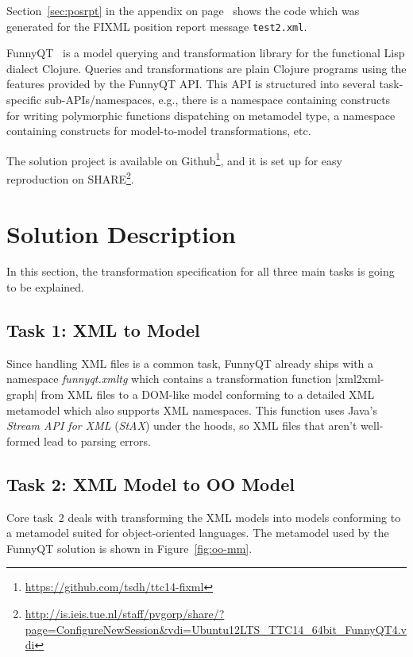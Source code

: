 \documentclass[submission]{eptcs}
\newcommand{\code}{\clojureinline}
\begin{document}
Section~\ref{sec:posrpt} in the appendix on page~\pageref{sec:posrpt} shows the
code which was generated for the FIXML position report message
\texttt{test2.xml}.

FunnyQT~\cite{Horn2013MQWFQ} is a model querying and transformation library for
the functional Lisp dialect Clojure.  Queries and transformations are plain
Clojure programs using the features provided by the FunnyQT API.  This API is
structured into several task-specific sub-APIs/namespaces, e.g., there is a
namespace containing constructs for writing polymorphic functions dispatching
on metamodel type, a namespace containing constructs for model-to-model
transformations, etc.

The solution project is available on
Github\footnote{\url{https://github.com/tsdh/ttc14-fixml}}, and it is set up
for easy reproduction on
SHARE\footnote{\url{http://is.ieis.tue.nl/staff/pvgorp/share/?page=ConfigureNewSession&vdi=Ubuntu12LTS_TTC14_64bit_FunnyQT4.vdi}}.

\section{Solution Description}
\label{sec:solution-description}

In this section, the transformation specification for all three main tasks is
going to be explained.

\subsection{Task 1: XML to Model}
\label{sec:xml2model}

Since handling XML files is a common task, FunnyQT already ships with a
namespace \emph{funnyqt.xmltg} which contains a transformation function
\code|xml2xml-graph| from XML files to a DOM-like model conforming to a
detailed XML metamodel which also supports XML namespaces.  This function uses
Java's \emph{Stream API for XML} (\emph{StAX}) under the hoods, so XML files
that aren't well-formed lead to parsing errors.


\subsection{Task 2: XML Model to OO Model}
\label{sec:xml-to-oo}

Core task~2 deals with transforming the XML models into models conforming to a
metamodel suited for object-oriented languages.  The metamodel used by the
FunnyQT solution is shown in Figure~\ref{fig:oo-mm}.
\end{document}

